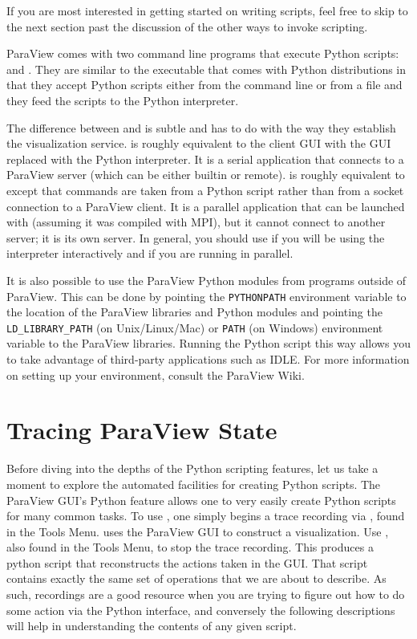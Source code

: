 If you are most interested in getting started on writing scripts,
feel free to skip to the next section past the discussion of the other ways
to invoke scripting.

ParaView comes with two command line programs that execute Python scripts:
 and .  They are similar to the
 executable that comes with Python distributions in
that they accept Python scripts either from the command line or from a file
and they feed the scripts to the Python interpreter.

The difference between  and  is
subtle and has to do with the way they establish the visualization
service.   is roughly equivalent to the
 client GUI with the GUI replaced with the Python
interpreter.  It is a serial application that connects to a ParaView server
(which can be either builtin or remote).   is roughly
equivalent to  except that commands are taken from a
Python script rather than from a socket connection to a ParaView client.  
It is a
parallel application that can be launched with  (assuming
it was compiled with MPI), but it cannot connect to another server; it is
its own server.  In general, you should use  if you
will be using the interpreter interactively and  if
you are running in parallel.

It is also possible to use the ParaView Python modules from programs
outside of ParaView.  This can be done by pointing the \texttt{PYTHONPATH}
environment variable to the location of the ParaView libraries and Python
modules and pointing the \texttt{LD\_LIBRARY\_PATH} (on Unix/Linux/Mac) or
\texttt{PATH} (on Windows) environment variable to the ParaView libraries.
Running the Python script this way allows you to take advantage of
third-party applications such as IDLE.  For more information on setting up
your environment, consult the ParaView Wiki.

\section{Tracing ParaView State}
\label{sec:TracingParaViewState}

Before diving into the depths of the Python scripting features, let us take
a moment to explore the automated facilities for creating Python scripts.
The ParaView GUI's Python  feature
allows one to very easily create Python scripts for many common
tasks. To use , one simply begins a trace recording via 
, found in the Tools Menu.   
uses the ParaView GUI to construct a
visualization.  Use , also found in the Tools Menu, 
to stop the trace recording. This produces a
python script that reconstructs the actions taken in the GUI. That
script contains exactly the same set of operations that we are
about to describe. As such,  recordings are a good resource when
you are trying to figure out how to do some action via the Python
interface, and conversely the following descriptions will help in
understanding the contents of any given  script.

